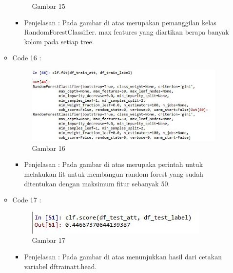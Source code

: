 \begin{enumerate}
\begin{itemize}
\begin{figure}[ht]
\caption{Gambar 15}
\label{contoh}
\end{figure}
\par
\begin{itemize} 
\item Penjelasan : Pada gambar di atas merupakan pemanggilan kelas RandomForestClassifier. max features yang diartikan berapa banyak kolom pada setiap tree.
\par
\par
\end{itemize}
\item Code 16 :
\par
\begin{figure}[ht]
\centering
\includegraphics[scale=0.7]{figures/pd16.jpg}
\caption{Gambar 16}
\label{contoh}
\end{figure}
\par
\begin{itemize}
\item Penjelasan : Pada gambar di atas merupaka perintah untuk melakukan fit untuk membangun random forest yang sudah ditentukan dengan maksimum fitur sebanyak 50.
\par
\par
\end{itemize}
\item Code 17 :
\par
\begin{figure}[ht]
\centering
\includegraphics[scale=0.7]{figures/pd18.jpg}
\caption{Gambar 17}
\label{contoh}
\end{figure}
\par
\begin{itemize}
\item Penjelasan : Pada gambar di atas menunjukkan hasil dari cetakan variabel dftrainatt.head.
\par
\par

\end{itemize}
\end{itemize}
\end{enumerate}
